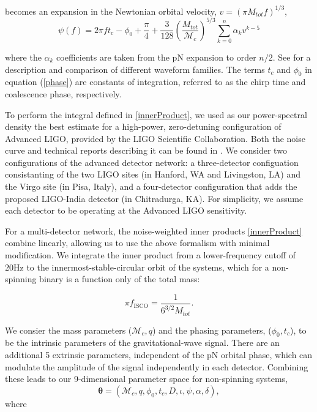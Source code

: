\documentclass[11pt,a4paper]{emulateapj} 
\newcommand{\thpara}{\boldsymbol{\theta}}
\newcommand{\chmass}{\mathcal{M}_c}
\begin{document}
becomes an expansion in the Newtonian orbital velocity, $v=(\pi
M_{tot} f)^{1/3}$,
\begin{equation}
\psi(f) = 2 \pi f t_c - \phi_0 + \frac{\pi}{4} +
\frac{3}{128}\left(\frac{M_{tot}}{\chmass}\right)^{5/3}\sum^{n}_{k=0}\alpha_{k}v^{k-5}
\label{phase}
\end{equation}

\noindent where the $\alpha_{k}$ coefficients are taken from the pN
expansion to order $n/2$.  See \cite{BuonannoWaveform} for a
description and comparison of different waveform families.  The terms
$t_c$ and $\phi_0$ in equation (\ref{phase}) are constants of
integration, referred to as the chirp time and coalescence phase,
respectively.

To perform the integral defined in \eqref{innerProduct}, we used as
our power-spectral density the best estimate for a high-power,
zero-detuning configuration of Advanced LIGO, provided by the LIGO
Scientific Collaboration.  Both the noise curve and technical reports
describing it can be found in \cite{ADVLIGONoise}.  We consider two
configurations of the advanced detector network: a three-detector
configuation consistanting of the two LIGO sites (in Hanford, WA and
Livingston, LA) and the Virgo site (in Pisa, Italy), and a
four-detector configuration that adds the proposed LIGO-India detector
(in Chitradurga, KA).  For simplicity, we assume each detector to be
operating at the Advanced LIGO sensitivity.


For a multi-detector network, the noise-weighted inner products
\eqref{innerProduct} combine linearly, allowing us to use the above
formalism with minimal modification.  We integrate the inner product
from a lower-frequency cutoff of $20\text{Hz}$ to the
innermost-stable-circular orbit of the systems, which for
a non-spinning binary is a function only of the total mass:

\begin{equation}
  \pi f_{\text{ISCO}} = \frac{1}{6^{3/2}M_{tot}}.
  \label{ISCOFrequency}
\end{equation}
   
We consier the mass parameters ($\chmass,q$) and the phasing
parameters, ($\phi_0,t_c$), to be the intrinsic parameters of the
gravitational-wave signal.  There are an additional 5 extrinsic
parameters, independent of the pN orbital phase, which can modulate
the amplitude of the signal independently in each
detector.  Combining these leads to our 9-dimensional parameter space
for non-spinning systems,
\begin{equation}
\thpara = (\chmass, q, \phi_0,t_c,D,\iota,\psi,\alpha,\delta),
\label{parameterspace}
\end{equation}
where
\end{document}

